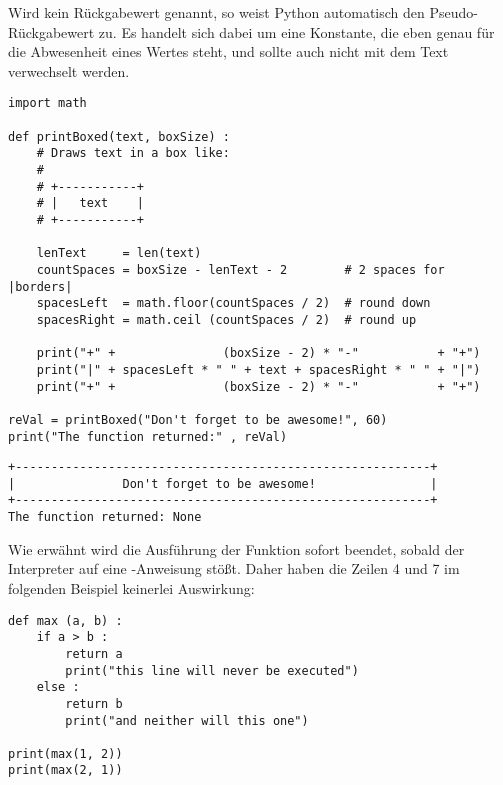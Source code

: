 Wird kein Rückgabewert genannt, so weist Python automatisch den Pseudo-Rückgabewert  zu. Es handelt sich dabei um eine Konstante, die eben genau für die Abwesenheit eines Wertes steht, und sollte auch nicht mit dem Text  verwechselt werden.
\begin{codebox}
\begin{verbatim}
import math

def printBoxed(text, boxSize) :
    # Draws text in a box like:
    #
    # +-----------+
    # |   text    |
    # +-----------+
  
    lenText     = len(text)
    countSpaces = boxSize - lenText - 2        # 2 spaces for |borders|
    spacesLeft  = math.floor(countSpaces / 2)  # round down
    spacesRight = math.ceil (countSpaces / 2)  # round up
  
    print("+" +               (boxSize - 2) * "-"           + "+")
    print("|" + spacesLeft * " " + text + spacesRight * " " + "|")
    print("+" +               (boxSize - 2) * "-"           + "+")
  
reVal = printBoxed("Don't forget to be awesome!", 60)
print("The function returned:" , reVal)
\end{verbatim}
\end{codebox}

\begin{cmdbox}
\begin{verbatim}
+----------------------------------------------------------+
|               Don't forget to be awesome!                |
+----------------------------------------------------------+
The function returned: None
\end{verbatim}
\end{cmdbox}

Wie erwähnt wird die Ausführung der Funktion sofort beendet, sobald der Interpreter auf eine -Anweisung stößt. Daher haben die Zeilen 4 und 7 im folgenden Beispiel keinerlei Auswirkung:
\begin{codebox}
\begin{verbatim}
def max (a, b) :
    if a > b :
        return a
        print("this line will never be executed")
    else :
        return b
        print("and neither will this one")

print(max(1, 2))
print(max(2, 1))
\end{verbatim}
\end{codebox}

